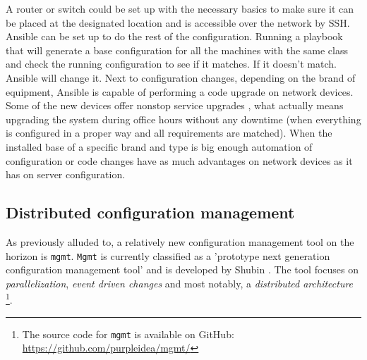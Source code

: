A router or switch could be set up with the necessary basics to make sure it can be placed at the designated location and is accessible over the network by SSH. Ansible can be set up to do the rest of the configuration. Running a playbook that will generate a base configuration for all the machines with the same class and check the running configuration to see if it matches. If it doesn't match. Ansible will change it. Next to configuration changes, depending on the brand of equipment, Ansible is capable of performing a code upgrade on network devices. Some of the new devices offer nonstop service upgrades \cite{NSSU}\cite{ISSU}, what actually means upgrading the system during office hours without any downtime (when everything is configured in a proper way and all requirements are matched). When the installed base of a specific brand and type is big enough automation of configuration or code changes have as much advantages on network devices as it has on server configuration.  

\subsection{Distributed configuration management}\label{subsec:distributedmgmt}
As previously alluded to, a relatively new configuration management tool on the horizon is \texttt{mgmt}. \texttt{Mgmt} is currently classified as a 'prototype next generation configuration management tool' and is developed by Shubin \cite{shubin2016}. The tool focuses on \textit{parallelization}, \textit{event driven changes} and most notably, a \textit{distributed architecture} \footnote{The source code for \texttt{mgmt} is available on GitHub: \url{https://github.com/purpleidea/mgmt/}}. 

